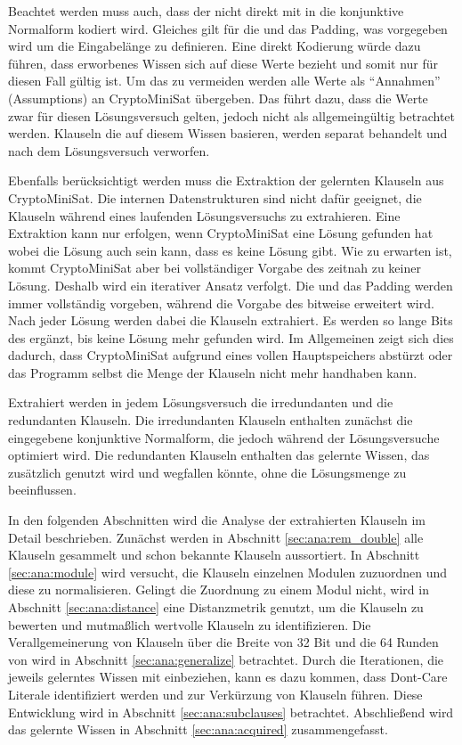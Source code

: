 Beachtet werden muss auch, dass der  nicht direkt mit in die konjunktive Normalform kodiert wird. Gleiches gilt für die 
und das Padding, was vorgegeben wird um die Eingabelänge zu definieren. Eine direkt Kodierung würde dazu führen, dass erworbenes Wissen
sich auf diese Werte bezieht und somit nur für diesen Fall gültig ist. Um das zu vermeiden werden alle Werte als "`Annahmen"' (Assumptions)
an CryptoMiniSat übergeben. Das führt dazu, dass die Werte zwar für diesen Lösungsversuch gelten, jedoch nicht als allgemeingültig betrachtet
werden. Klauseln die auf diesem Wissen basieren, werden separat behandelt und nach dem Lösungsversuch verworfen.

Ebenfalls berücksichtigt werden muss die Extraktion der gelernten Klauseln aus CryptoMiniSat. Die internen Datenstrukturen sind nicht dafür
geeignet, die Klauseln während eines laufenden Lösungsversuchs zu extrahieren. Eine Extraktion kann nur erfolgen, wenn CryptoMiniSat eine
Lösung gefunden hat wobei die Lösung auch sein kann, dass es keine Lösung gibt. Wie zu erwarten ist, kommt CryptoMiniSat aber bei vollständiger
Vorgabe des  zeitnah zu keiner Lösung. Deshalb wird ein iterativer Ansatz verfolgt. Die  und das Padding werden immer vollständig vorgeben,
während die Vorgabe des  bitweise erweitert wird. Nach jeder Lösung werden dabei die Klauseln extrahiert. Es werden so lange Bits des 
ergänzt, bis keine Lösung mehr gefunden wird. Im Allgemeinen zeigt sich dies dadurch, dass CryptoMiniSat aufgrund eines vollen Hauptspeichers
abstürzt oder das Programm selbst die Menge der Klauseln nicht mehr handhaben kann.

Extrahiert werden in jedem Lösungsversuch die irredundanten und die redundanten Klauseln. Die irredundanten Klauseln enthalten zunächst die
eingegebene konjunktive Normalform, die jedoch während der Lösungsversuche optimiert wird. Die redundanten Klauseln enthalten das gelernte
Wissen, das zusätzlich genutzt wird und wegfallen könnte, ohne die Lösungsmenge zu beeinflussen.

In den folgenden Abschnitten wird die Analyse der extrahierten Klauseln im Detail beschrieben. Zunächst werden in Abschnitt \ref{sec:ana:rem_double}
alle Klauseln gesammelt und schon bekannte Klauseln aussortiert. In Abschnitt \ref{sec:ana:module} wird versucht, die Klauseln einzelnen Modulen
zuzuordnen und diese zu normalisieren. Gelingt die Zuordnung zu einem Modul nicht, wird in Abschnitt \ref{sec:ana:distance} eine Distanzmetrik
genutzt, um die Klauseln zu bewerten und mutmaßlich wertvolle Klauseln zu identifizieren. Die Verallgemeinerung von Klauseln über die Breite von
32 Bit und die 64 Runden von  wird in Abschnitt \ref{sec:ana:generalize} betrachtet. Durch die Iterationen, die jeweils gelerntes Wissen mit
einbeziehen, kann es dazu kommen, dass Dont-Care Literale identifiziert werden und zur Verkürzung von Klauseln führen. Diese Entwicklung wird in
Abschnitt \ref{sec:ana:subclauses} betrachtet. Abschließend wird das gelernte Wissen in Abschnitt \ref{sec:ana:acquired} zusammengefasst.






